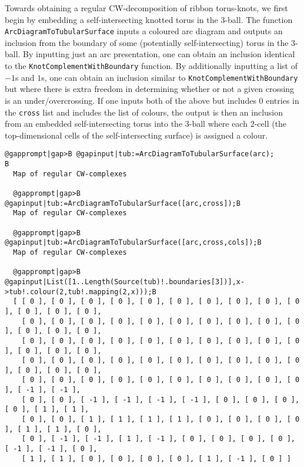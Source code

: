 \documentclass[a4paper,11pt]{report}
\begin{document}
{{  

 Towards obtaining a regular CW-decomposition of ribbon torus-knots, we first
begin by embedding a self-intersecting knotted torus in the 3-ball. The
function \texttt{ArcDiagramToTubularSurface} inputs a coloured arc diagram and outputs an inclusion from the boundary of
some (potentially self-intersecting) torus in the $3$-ball. By inputting just an arc presentation, one can obtain an inclusion
identical to the \texttt{KnotComplementWithBoundary} function. By additionally inputting a list of $-1$s and $1$s, one can obtain an inclusion similar to \texttt{KnotComplementWithBoundary} but where there is extra freedom in determining whether or not a given
crossing is an under/overcrossing. If one inputs both of the above but
includes $0$ entries in the \texttt{cross} list and includes the list of colours, the output is then an inclusion from an
embedded self-intersecting torus into the 3-ball where each $2$-cell (the top-dimensional cells of the self-intersecting surface) is assigned
a colour. 
\begin{Verbatim}[commandchars=@|B,fontsize=\small,frame=single,label=Example]
  @gapprompt|gap>B @gapinput|tub:=ArcDiagramToTubularSurface(arc);        B
  Map of regular CW-complexes
  
  @gapprompt|gap>B @gapinput|tub:=ArcDiagramToTubularSurface([arc,cross]);B
  Map of regular CW-complexes
  
  @gapprompt|gap>B @gapinput|tub:=ArcDiagramToTubularSurface([arc,cross,cols]);B
  Map of regular CW-complexes
  
  @gapprompt|gap>B @gapinput|List([1..Length(Source(tub)!.boundaries[3])],x->tub!.colour(2,tub!.mapping(2,x)));B
  [ [ 0 ], [ 0 ], [ 0 ], [ 0 ], [ 0 ], [ 0 ], [ 0 ], [ 0 ], [ 0 ], [ 0 ], [ 0 ], [ 0 ], [ 0 ], 
    [ 0 ], [ 0 ], [ 0 ], [ 0 ], [ 0 ], [ 0 ], [ 0 ], [ 0 ], [ 0 ], [ 0 ], [ 0 ], [ 0 ], [ 0 ], 
    [ 0 ], [ 0 ], [ 0 ], [ 0 ], [ 0 ], [ 0 ], [ 0 ], [ 0 ], [ 0 ], [ 0 ], [ 0 ], [ 0 ], [ 0 ], 
    [ 0 ], [ 0 ], [ 0 ], [ 0 ], [ 0 ], [ 0 ], [ 0 ], [ 0 ], [ 0 ], [ 0 ], [ 0 ], [ 0 ], [ 0 ], 
    [ 0 ], [ 0 ], [ 0 ], [ 0 ], [ 0 ], [ 0 ], [ 0 ], [ 0 ], [ 0 ], [ 0 ], [ -1 ], [ -1 ], 
    [ 0 ], [ 0 ], [ -1 ], [ -1 ], [ -1 ], [ -1 ], [ 0 ], [ 0 ], [ 0 ], [ 0 ], [ 1 ], [ 1 ], 
    [ 0 ], [ 0 ], [ 1 ], [ 1 ], [ 1 ], [ 1 ], [ 0 ], [ 0 ], [ 0 ], [ 0 ], [ 1 ], [ 1 ], [ 0 ], 
    [ 0 ], [ -1 ], [ -1 ], [ 1 ], [ -1 ], [ 0 ], [ 0 ], [ 0 ], [ 0 ], [ -1 ], [ -1 ], [ 0 ], 
    [ 1 ], [ 1 ], [ 0 ], [ 0 ], [ 0 ], [ 0 ], [ 1 ], [ -1 ], [ 0 ] ]
  

\end{Verbatim}}}
\end{document}
